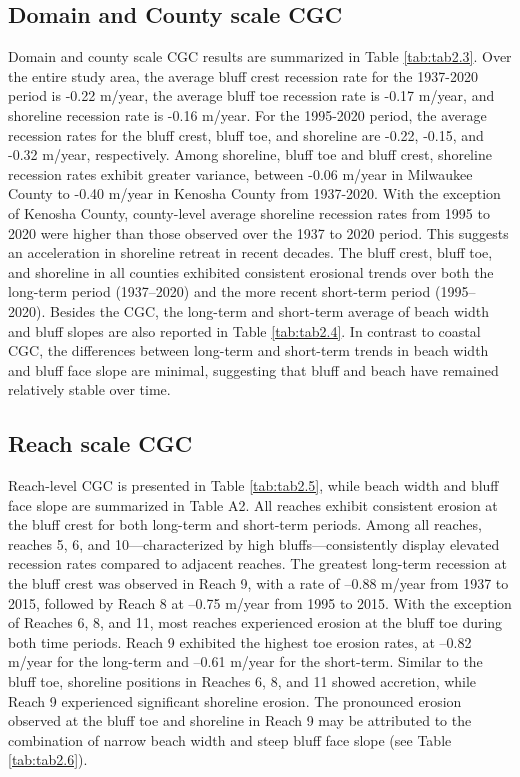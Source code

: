 \subsection{Domain and County scale CGC} 
\label{Domain and County scale CGC}

Domain and county scale CGC  results are summarized in Table \ref{tab:tab2.3}.
Over the entire study area, the average bluff crest recession rate for the
1937-2020 period is -0.22 m/year, the average bluff toe recession rate is -0.17
m/year, and shoreline recession rate is -0.16 m/year. For the 1995-2020 period,
the average recession rates for the bluff crest, bluff toe, and shoreline are
-0.22, -0.15, and -0.32 m/year, respectively. Among shoreline, bluff toe and
bluff crest, shoreline recession rates exhibit greater variance, between -0.06
m/year in Milwaukee County to -0.40 m/year in Kenosha County from 1937-2020.
With the exception of Kenosha County, county-level average shoreline recession
rates from 1995 to 2020 were higher than those observed over the 1937 to 2020
period. This suggests an acceleration in shoreline retreat in recent decades.
The bluff crest, bluff toe, and shoreline in all counties exhibited consistent
erosional trends over both the long-term period (1937–2020) and the more recent
short-term period (1995–2020). Besides the CGC, the long-term and short-term
average of beach width and bluff slopes are also reported in Table
\ref{tab:tab2.4}. In contrast to coastal CGC, the differences between long-term
and short-term trends in beach width and bluff face slope are minimal,
suggesting that bluff and beach have remained relatively stable over time.
 


\subsection{Reach scale CGC} 
\label{Reach scale CGC} 

Reach-level CGC is presented in Table \ref{tab:tab2.5}, while beach width and
bluff face slope are summarized in Table A2. All reaches exhibit consistent
erosion at the bluff crest for both long-term and short-term periods. Among all
reaches, reaches 5, 6, and 10—characterized by high bluffs—consistently display
elevated recession rates compared to adjacent reaches. The greatest long-term
recession at the bluff crest was observed in Reach 9, with a rate of –0.88
m/year from 1937 to 2015, followed by Reach 8 at –0.75 m/year from 1995 to 2015.
With the exception of Reaches 6, 8, and 11, most reaches experienced erosion at
the bluff toe during both time periods. Reach 9 exhibited the highest toe
erosion rates, at –0.82 m/year for the long-term and –0.61 m/year for the
short-term. Similar to the bluff toe, shoreline positions in Reaches 6, 8, and
11 showed accretion, while Reach 9 experienced significant shoreline erosion.
The pronounced erosion observed at the bluff toe and shoreline in Reach 9 may be
attributed to the combination of narrow beach width and steep bluff face slope
(see Table \ref{tab:tab2.6}).  



